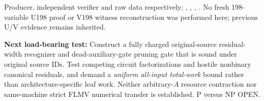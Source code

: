 \documentclass[11pt]{article}
\begin{document}
Producer, independent verifier and raw data respectively:
,
,
,
.
No fresh 198-variable U198 proof or V198 witness reconstruction was performed here; previous U/V evidence remains inherited.

\noindent\textbf{Next load-bearing test:} Construct a fully charged original-source residual-width recognizer and dead-auxiliary-gate pruning gate that is sound under original source IDs. Test competing circuit factorizations and hostile nonbinary canonical residuals, and demand a \emph{uniform all-input total-work} bound rather than architecture-specific leaf work. Neither arbitrary-$A$ resource contraction nor same-machine strict FLMV numerical transfer is established. P versus NP OPEN.


\end{document}

